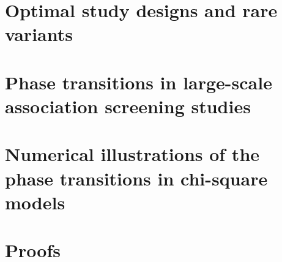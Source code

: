 \section{Optimal study designs and rare variants}
\label{sec:optimal-design} 



\section{Phase transitions in large-scale association screening studies}
\label{sec:phase-transitions-in-GWAS}



\section{Numerical illustrations of the phase transitions in chi-square models}
\label{sec:numerical}



\section{Proofs}
\label{sec:proof-signal-size-odds-ratio}

